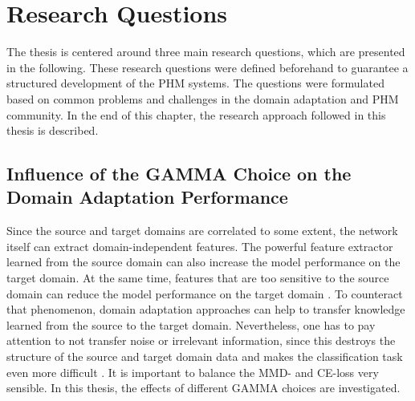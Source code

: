 \chapter{Research Questions}\label{chapter:research_approach}
The thesis is centered around three main research questions, which are presented in the following. These research questions were defined beforehand to guarantee a structured development of the PHM systems. The questions were formulated based on common problems and challenges in the domain adaptation and PHM community. In the end of this chapter, the research approach followed in this thesis is described.

\section{Influence of the GAMMA Choice on the Domain Adaptation Performance}
Since the source and target domains are correlated to some extent, the network itself can extract domain-independent features. The powerful feature extractor learned from the source domain can also increase the model performance on the target domain. At the same time, features that are too sensitive to the source domain can reduce the model performance on the target domain \cite{li2020}. To counteract that phenomenon, domain adaptation approaches can help to transfer knowledge learned from the source to the target domain. Nevertheless, one has to pay attention to not transfer noise or irrelevant information, since this destroys the structure of the source and target domain data and makes the classification task even more difficult \cite{li2020}. It is important to balance the MMD- and CE-loss very sensible. In this thesis, the effects of different GAMMA choices are investigated.

